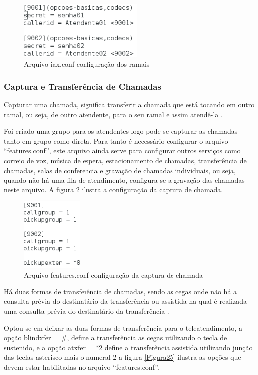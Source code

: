 \begin{figure}[h]
	\centering
	\includegraphics[width=6cm]{imagens/iax.png}
	\caption{Arquivo iax.conf configuração dos ramais}
    \label{Figura23}
\end{figure}

\subsubsection{Captura e Transferência de Chamadas}
Capturar uma chamada, significa transferir a chamada que está tocando em outro ramal, ou seja, de outro atendente, para o seu ramal e assim atendê-la \cite{alexandrekeller2014}.

Foi criado uma grupo para os atendentes logo pode-se capturar as chamadas tanto em grupo como direta. Para tanto é necessário configurar o arquivo ``features.conf'', este arquivo ainda serve para configurar outros serviços como correio de voz, música de espera, estacionamento de chamadas, transferência de chamadas, salas de conferencia e gravação de chamadas individuais, ou seja, quando não há uma fila de atendimento, configura-se a gravação das chamadas neste arquivo. A figura \ref{Figura24} ilustra a configuração da captura de chamada.

\begin{figure}[h]
	\centering
	\includegraphics[width=3cm]{imagens/features.png}
	\caption{Arquivo features.conf configuração da captura de chamada}
    \label{Figura24}
\end{figure}

Há duas formas de transferência de chamadas, sendo as cegas onde não há a consulta prévia do destinatário da transferência ou assistida na qual é realizada uma consulta prévia do destinatário da transferência \cite{alexandrekeller2014}.

Optou-se em deixar as duas formas de transferência para o teleatendimento, a opção blindxfer = \#, define a transferência as cegas utilizando o tecla de sustenido, e a opção atxfer = *2 define a transferência assistida utilizando junção das teclas asterisco mais o numeral 2 a figura \ref{Figura25} ilustra as opções que devem estar habilitadas no arquivo ``features.conf''.

